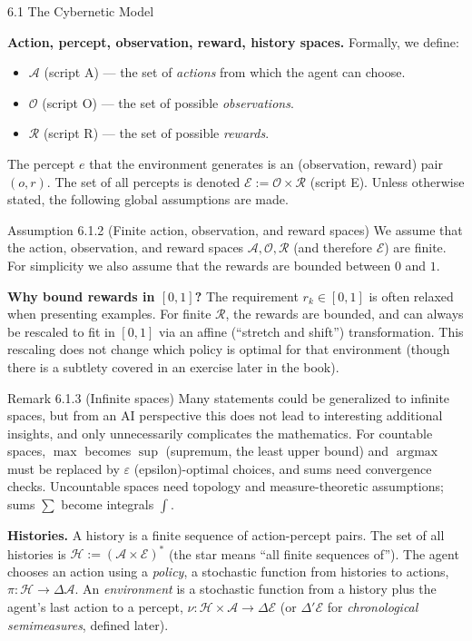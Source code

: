 \documentclass[aspectratio=169,10pt]{beamer}
\newcommand{\A}{\mathcal{A}}
\newcommand{\Ocal}{\mathcal{O}}
\newcommand{\Rcal}{\mathcal{R}}
\newcommand{\Ecal}{\mathcal{E}}
\newcommand{\Hcal}{\mathcal{H}}
\begin{document}
\begin{frame}[allowframebreaks]{6.1 The Cybernetic Model}
\framebreak

\textbf{Action, percept, observation, reward, history spaces.} Formally, we
define:
\begin{itemize}
  \item $\A$ (script A) --- the set of \emph{actions} from which the agent
    can choose.
  \item $\Ocal$ (script O) --- the set of possible \emph{observations}.
  \item $\Rcal$ (script R) --- the set of possible \emph{rewards}.
\end{itemize}
The percept $e$ that the environment generates is an (observation, reward)
pair $(o,r)$. The set of all percepts is denoted
$\Ecal := \Ocal \times \Rcal$ (script E). Unless otherwise stated, the
following global assumptions are made.

\begin{block}{Assumption 6.1.2 (Finite action, observation, and reward spaces)}
We assume that the action, observation, and reward spaces $\A, \Ocal,
\Rcal$ (and therefore $\Ecal$) are finite. For simplicity we also assume
that the rewards are bounded between $0$ and $1$.
\end{block}

\textbf{Why bound rewards in $[0,1]$?} The requirement $r_k \in [0,1]$ is
often relaxed when presenting examples. For finite $\Rcal$, the rewards are
bounded, and can always be rescaled to fit in $[0,1]$ via an affine
(``stretch and shift'') transformation. This rescaling does not change
which policy is optimal for that environment (though there is a subtlety
covered in an exercise later in the book).

\begin{block}{Remark 6.1.3 (Infinite spaces)}
Many statements could be generalized to infinite spaces, but from an AI
perspective this does not lead to interesting additional insights, and only
unnecessarily complicates the mathematics. For countable spaces, $\max$
becomes $\sup$ (supremum, the least upper bound) and $\operatorname{argmax}$
must be replaced by $\varepsilon$ (epsilon)-optimal choices, and sums need
convergence checks. Uncountable spaces need topology and measure-theoretic
assumptions; sums $\sum$ become integrals $\int$.
\end{block}

\framebreak

\textbf{Histories.} A history is a finite sequence of action-percept pairs.
The set of all histories is $\Hcal := (\A \times \Ecal)^{*}$ (the star
means ``all finite sequences of''). The agent chooses an action using a
\emph{policy}, a stochastic function from histories to actions,
$\pi: \Hcal \to \Delta \A$. An \emph{environment} is a stochastic function
from a history plus the agent's last action to a percept,
$\nu: \Hcal \times \A \to \Delta \Ecal$ (or $\Delta' \Ecal$ for
\emph{chronological semimeasures}, defined later).


\end{frame}
\end{document}
